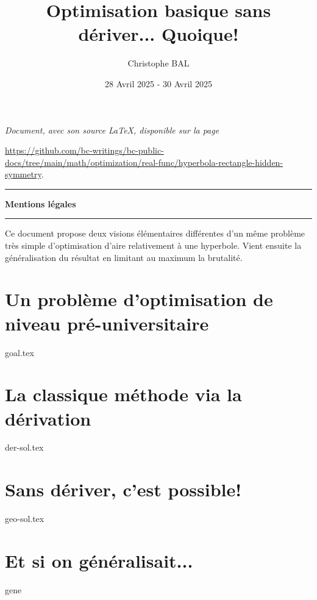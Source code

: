 \documentclass[12pt]{amsart}
\begin{document}
\title{Optimisation basique sans dériver... Quoique!}
\author{Christophe BAL}
\date{28 Avril 2025 - 30 Avril 2025}

\maketitle

\begin{center}
	\itshape
	Document, avec son source \LaTeX, disponible sur la page

	\url{https://github.com/bc-writings/bc-public-docs/tree/main/math/optimization/real-func/hyperbola-rectangle-hidden-symmetry}.
\end{center}


\bigskip


\begin{center}
	\hrule\vspace{.3em}
	{
		\fontsize{1.35em}{1em}\selectfont
		\textbf{Mentions \og légales \fg}
	}

	\vspace{0.45em}
	\doclicenseThis
	\hrule
\end{center}


\bigskip


\setcounter{tocdepth}{2}
\tableofcontents




\newpage

\begin{meta-abstract*}
	Ce document propose deux visions élémentaires différentes d'un même problème très simple d'optimisation d'aire relativement à une hyperbole.
	Vient ensuite la généralisation du résultat en limitant au maximum la brutalité.
\end{meta-abstract*}




\section{Un problème d'optimisation de niveau pré-universitaire}

{goal.tex}





\section{La classique méthode via la dérivation}

{der-sol.tex}




\section{Sans dériver, c'est possible!} \label{exa-geo}

{geo-sol.tex}




\section{Et si on généralisait...}

{gene}
	
\end{document}
